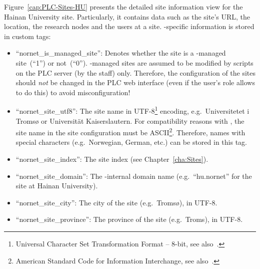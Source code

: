 Figure~\ref{cap:PLC-Sites-HU} presents the detailed site information view for the Hainan University site. Particularly, it contains data such as the site's URL, the location, the research nodes and the users at a site. -specific information is stored in custom tags:
\begin{itemize}
 \item ``nornet\_is\_managed\_site'': Denotes whether the site is a -managed site~(``1'') or not~(``0''). -managed sites are assumed to be modified by scripts on the PLC server (by the  staff) only. Therefore, the configuration of the sites should \emph{not} be changed in the PLC web interface (even if the user's role allows to do this) to avoid misconfiguration!

 \item ``nornet\_site\_utf8'': The site name in UTF-8\footnote{Universal Character Set Transformation Format -- 8-bit, see also~\cite{RFC3629}.} encoding, e.g.\ \foreignlanguage{norsk}{Universitetet i Tromsø} or \foreignlanguage{german}{Universität Kaiserslautern}. For compatibility reasons with , the site name in the site configuration must be ASCII\footnote{American Standard Code for Information Interchange, see also~\cite{Fis00}.}. Therefore, names with special characters (e.g.\ Norwegian, German, etc.) can be stored in this tag.
 
 \item ``nornet\_site\_index'': The  site index (see Chapter~\ref{cha:Sites}).
 
 \item ``nornet\_site\_domain'': The -internal domain name (e.g.\ ``hu.nornet'' for the site at Hainan University).
 
 \item ``nornet\_site\_city'': The city of the site (e.g.\ Tromsø), in UTF-8.
 
 \item ``nornet\_site\_province'': The province of the site (e.g.\ Troms), in UTF-8.
 

\end{itemize}
